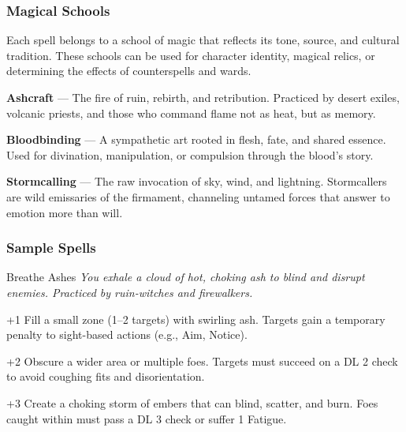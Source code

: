 \subsubsection*{Magical Schools}

Each spell belongs to a school of magic that reflects its tone, source, and cultural tradition. These schools can be used for character identity, magical relics, or determining the effects of counterspells and wards.

\vspace{0.5\baselineskip}
\textbf{Ashcraft} — The fire of ruin, rebirth, and retribution. Practiced by desert exiles, volcanic priests, and those who command flame not as heat, but as memory.

\textbf{Bloodbinding} — A sympathetic art rooted in flesh, fate, and shared essence. Used for divination, manipulation, or compulsion through the blood’s story.

\textbf{Stormcalling} — The raw invocation of sky, wind, and lightning. Stormcallers are wild emissaries of the firmament, channeling untamed forces that answer to emotion more than will.

\subsubsection*{Sample Spells}

\begin{WyrdSpell}[Ashcraft]{Breathe Ashes}
\textit{You exhale a cloud of hot, choking ash to blind and disrupt enemies. Practiced by ruin-witches and firewalkers.}
    \begin{WyrdSpellBlock}
        \item[+1] Fill a small zone (1–2 targets) with swirling ash. Targets gain a temporary penalty to sight-based actions (e.g., Aim, Notice).
        \item[+2] Obscure a wider area or multiple foes. Targets must succeed on a DL 2 check to avoid coughing fits and disorientation.
        \item[+3] Create a choking storm of embers that can blind, scatter, and burn. Foes caught within must pass a DL 3 check or suffer 1 Fatigue.
    \end{WyrdSpellBlock}
\end{WyrdSpell}

